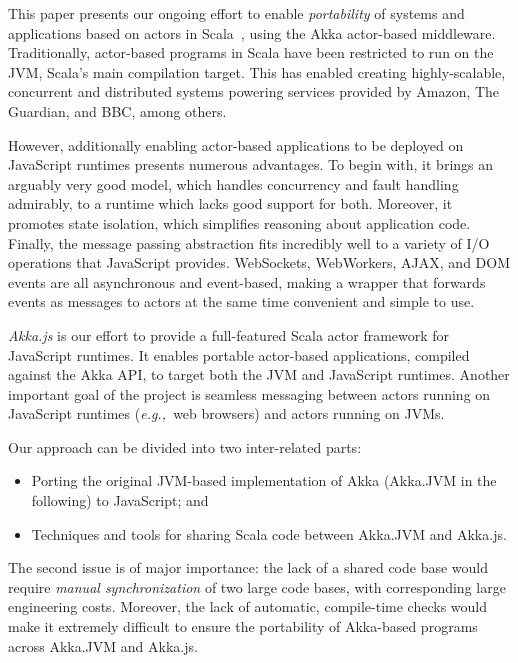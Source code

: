 \documentclass{sig-alternate}
\newcommand{\eg}{{\em e.g.,~}}
\begin{document}
This paper presents our ongoing effort to enable {\em portability} of systems and applications based on actors in Scala~\cite{ActorsInScala}, using the Akka actor-based middleware. Traditionally, actor-based programs in Scala have been restricted to run on the JVM, Scala's main compilation target. This has enabled creating highly-scalable, concurrent and distributed systems powering services provided by Amazon, The Guardian, and BBC, among others.

However, additionally enabling actor-based applications to be deployed on JavaScript runtimes presents numerous advantages. To begin with, it brings an arguably very good model, which handles concurrency and fault handling admirably, to a runtime which lacks good support for both. Moreover, it promotes state isolation, which simplifies reasoning about application code. Finally, the message passing abstraction fits incredibly well to a variety of I/O operations that JavaScript provides. WebSockets, WebWorkers, AJAX, and DOM events are all asynchronous and event-based, making a wrapper that forwards events as messages to actors at the same time convenient and simple to use.

{\em Akka.js} is our effort to provide a full-featured Scala actor framework for JavaScript runtimes. It enables portable actor-based applications,
compiled against the Akka API, to target both the JVM and JavaScript runtimes. Another important goal of the project is seamless
messaging between actors running on JavaScript runtimes (\eg web browsers) and actors running on JVMs.

Our approach can be divided into two inter-related parts:
\begin{itemize}
\item Porting the original JVM-based implementation of Akka (Akka.JVM in the following) to JavaScript; and
\item Techniques and tools for sharing Scala code between Akka.JVM and Akka.js.
\end{itemize}
\noindent
The second issue is of major importance: the lack of a shared code base would require {\em manual synchronization} of two large code bases, with
corresponding large engineering costs. Moreover, the lack of automatic, compile-time checks would make it extremely difficult to ensure the
portability of Akka-based programs across Akka.JVM and Akka.js.

\end{document}
